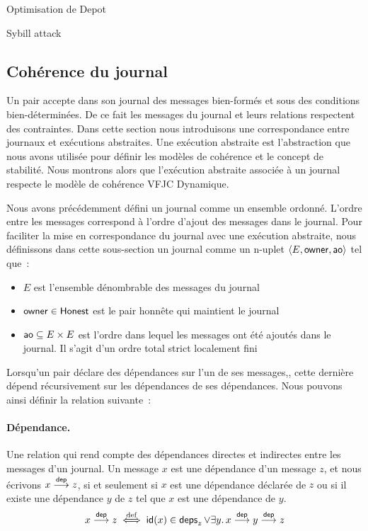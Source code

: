Optimisation de Depot

Sybill attack


\subsection{Cohérence du journal}

Un pair accepte dans son journal des messages bien-formés et sous des conditions bien-déterminées.
De ce fait les messages du journal et leurs relations respectent des contraintes.
Dans cette section nous introduisons une correspondance entre journaux et exécutions abstraites.
Une exécution abstraite est l'abstraction que nous avons utilisée pour définir les modèles de cohérence et le concept de stabilité.
Nous montrons alors que l'exécution abstraite associée à un journal respecte le modèle de cohérence \acl{VFJC} Dynamique.

Nous avons précédemment défini un journal comme un ensemble ordonné.
L'ordre entre les messages correspond à l'ordre d'ajout des messages dans le journal.
Pour faciliter la mise en correspondance du journal avec une exécution abstraite, nous définissons dans cette sous-section un journal comme un n-uplet $\tuple*{E, \trm{owner}, \trm{ao}}$ tel que~:
\begin{itemize}
    \item $E$ est l'ensemble dénombrable des messages du journal
    \item $\trm{owner} \in \trm{Honest}$ est le pair honnête qui maintient le journal
    \item $\trm{ao} \subseteq E \times E$ est l'ordre dans lequel les messages ont été ajoutés dans le journal.
    Il s'agit d'un ordre total strict localement fini
\end{itemize}

Lorsqu'un pair déclare des dépendances sur l'un de ses messages,, cette dernière dépend récursivement sur les dépendances de ses dépendances.
Nous pouvons ainsi définir la relation suivante~:

\paragraph{Dépendance.} Une relation qui rend compte des dépendances directes et indirectes entre les messages d'un journal.
Un message $x$ est une dépendance d'un message $z$, et nous écrivons $x \dep z$, si et seulement si $x$ est une dépendance déclarée de $z$ ou si il existe une dépendance $y$ de $z$ tel que $x$ est une dépendance de $y$.
\begin{equation*}
    x \dep z \defiff \trm{id}(x) \in \trm{deps}_z \lor \exists y \qsep x \dep y \dep z
\end{equation*}

